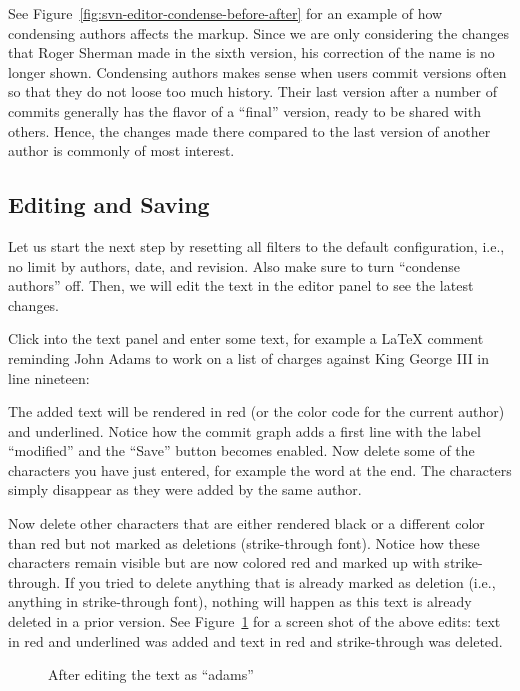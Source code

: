 See Figure~\ref{fig:svn-editor-condense-before-after} for an example of how condensing authors affects the markup.  Since we are only considering the changes that Roger Sherman made in the sixth version, his correction of the name is no longer shown.  Condensing authors makes sense when users commit versions often so that they do not loose too much history.  Their last version after a number of commits generally has the flavor of a ``final'' version, ready to be shared with others.  Hence, the changes made there compared to the last version of another author is commonly of most interest.

\subsection{Editing and Saving} %

Let us start the next step by resetting all filters to the default configuration, i.e., no limit by authors, date, and revision.  Also make sure to turn ``condense authors'' off.  Then, we will edit the text in the editor panel to see the latest changes.

Click into the text panel and enter some text, for example a LaTeX comment reminding John Adams to work on a list of charges against King George III in line nineteen:
\begin{FileVerbatim}
\end{FileVerbatim}
The added text will be rendered in red (or the color code for the current author) and underlined.  Notice how the commit graph adds a first line with the label ``modified'' and the ``Save'' button becomes enabled.  Now delete some of the characters you have just entered, for example the word  at the end.  The characters simply disappear as they were added by the same author.

Now delete other characters that are either rendered black or a different color than red but not marked as deletions (strike-through font).  Notice how these characters remain visible but are now colored red and marked up with strike-through.  If you tried to delete anything that is already marked as deletion (i.e., anything in strike-through font), nothing will happen as this text is already deleted in a prior version.  See Figure~\ref{fig:svn-editor-modified} for a screen shot of the above edits: text in red and underlined was added and text in red and strike-through was deleted.

\begin{figure}[t]
\centering
{}
\caption{After editing the text as ``adams''} \label{fig:svn-editor-modified}
\end{figure}

